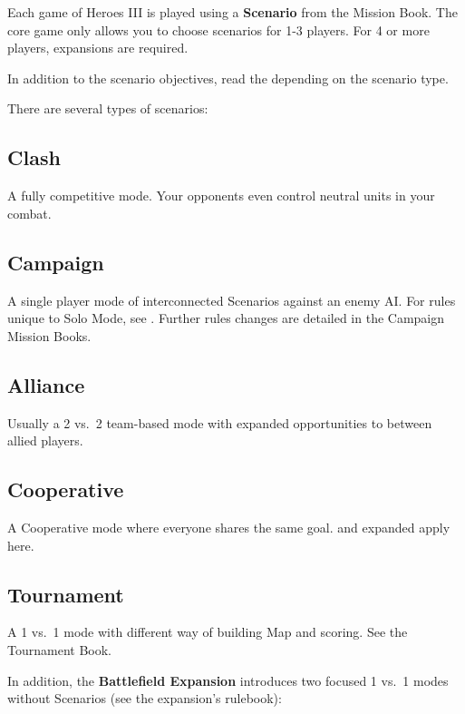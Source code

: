 
\begin{multicols*}{2}

Each game of Heroes III is played using a \textbf{Scenario} from the Mission Book.
The core game only allows you to choose scenarios for 1-3 players. For 4 or more players, expansions are required.\par
In addition to the scenario objectives, read the  depending on the scenario type.\par
There are several types of scenarios:

\subsection*{Clash}
A fully competitive mode. Your opponents even control neutral units in your combat.

\subsection*{Campaign}
A single player mode of interconnected Scenarios against an enemy AI.
For rules unique to Solo Mode, see .
Further rules changes are detailed in the Campaign Mission Books.

\subsection*{Alliance}
Usually a 2 vs.~2 team-based mode with expanded opportunities to  between allied players.

\subsection*{Cooperative}
A Cooperative mode where everyone shares the same goal.  and expanded  apply here.

\subsection*{Tournament}
A 1 vs.~1 mode with different way of building Map and scoring. See the Tournament Book.

\columnbreak

In addition, the \textbf{Battlefield Expansion} introduces two focused 1 vs.~1 modes without Scenarios (see the expansion's rulebook):


\end{multicols*}
